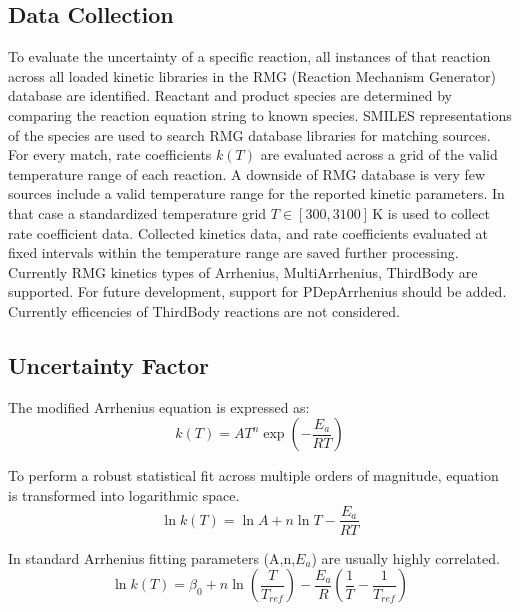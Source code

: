 \subsection{Data Collection}
To evaluate the uncertainty of a specific reaction, all instances of that reaction across all loaded kinetic libraries in the RMG (Reaction Mechanism Generator) database are identified. Reactant and product species are determined by comparing the reaction equation string to known species. SMILES representations of the species are used to search RMG database libraries for matching sources. For every match, rate coefficients $k(T)$ are evaluated across a grid of the valid temperature range of each reaction. A downside of RMG database is very few sources include a valid temperature range for the reported kinetic parameters. In that case a standardized temperature grid $T \in [300, 3100]$\,K is used to collect rate coefficient data. Collected kinetics data, and rate coefficients evaluated at fixed intervals within the temperature range are saved further processing. Currently RMG kinetics types of Arrhenius, MultiArrhenius, ThirdBody are supported. For future development, support for PDepArrhenius should be added. Currently efficencies of ThirdBody reactions are not considered.



\subsection{Uncertainty Factor}

The modified Arrhenius equation is expressed as:
\begin{equation}
	k(T) = A T^n \exp\left(-\frac{E_a}{RT}\right)
\end{equation}

To perform a robust statistical fit across multiple orders of magnitude, equation is transformed into logarithmic space. 
\begin{equation}
	\ln k(T) = \ln A + n \ln T - \frac{E_a}{RT}
\end{equation}

In standard Arrhenius fitting parameters (A,n,$E_a$) are usually highly correlated. 
\begin{equation}
\ln k(T) = \beta_0 + n \ln\left(\frac{T}{T_{ref}}\right) - \frac{E_a}{R} \left(\frac{1}{T} - \frac{1}{T_{ref}}\right)
\end{equation}

